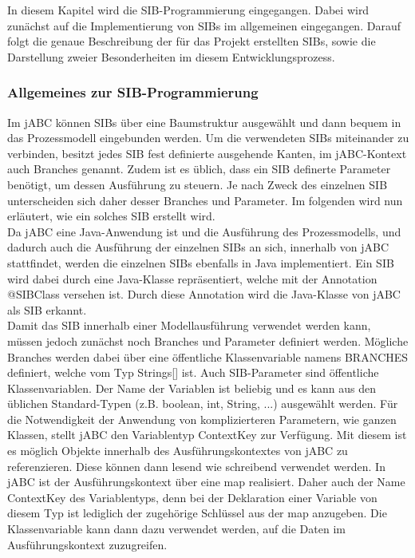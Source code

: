 
In diesem Kapitel wird die SIB-Programmierung eingegangen. Dabei wird zunächst auf die Implementierung von SIBs im allgemeinen eingegangen. Darauf folgt die genaue Beschreibung der für das Projekt erstellten SIBs, sowie die Darstellung zweier Besonderheiten im diesem Entwicklungsprozess.

\subsubsection{Allgemeines zur SIB-Programmierung}
Im jABC können SIBs über eine Baumstruktur ausgewählt und dann bequem in das Prozessmodell eingebunden werden. Um die verwendeten SIBs miteinander zu verbinden, besitzt jedes SIB fest definierte ausgehende Kanten, im jABC-Kontext auch Branches genannt. Zudem ist es üblich, dass ein SIB definerte Parameter benötigt, um dessen Ausführung zu steuern. Je nach Zweck des einzelnen SIB unterscheiden sich daher desser Branches und Parameter. Im folgenden wird nun erläutert, wie ein solches SIB erstellt wird.\\

Da jABC eine Java-Anwendung ist und die Ausführung des Prozessmodells, und dadurch auch die Ausführung der einzelnen SIBs an sich, innerhalb von jABC stattfindet, werden die einzelnen SIBs ebenfalls in Java implementiert. Ein SIB wird dabei durch eine Java-Klasse repräsentiert, welche mit der Annotation @SIBClass versehen ist. Durch diese Annotation wird die Java-Klasse von jABC als SIB erkannt.\\

Damit das SIB innerhalb einer Modellausführung verwendet werden kann, müssen jedoch zunächst noch Branches und Parameter definiert werden. Mögliche Branches werden dabei über eine öffentliche Klassenvariable namens BRANCHES definiert, welche vom Typ Strings[] ist. Auch SIB-Parameter sind öffentliche Klassenvariablen. Der Name der Variablen ist beliebig und es kann aus den üblichen Standard-Typen (z.B. boolean, int, String, ...) ausgewählt werden. Für die Notwendigkeit der Anwendung von komplizierteren Parametern, wie ganzen Klassen, stellt jABC den Variablentyp ContextKey zur Verfügung. Mit diesem ist es möglich Objekte innerhalb des Ausführungskontextes von jABC zu referenzieren. Diese können dann lesend wie schreibend verwendet werden. In jABC ist der Ausführungskontext über eine map realisiert. Daher auch der Name ContextKey des Variablentyps, denn bei der Deklaration einer Variable von diesem Typ ist lediglich der zugehörige Schlüssel aus der map anzugeben. Die Klassenvariable kann dann dazu verwendet werden, auf die Daten im Ausführungskontext zuzugreifen. \\

